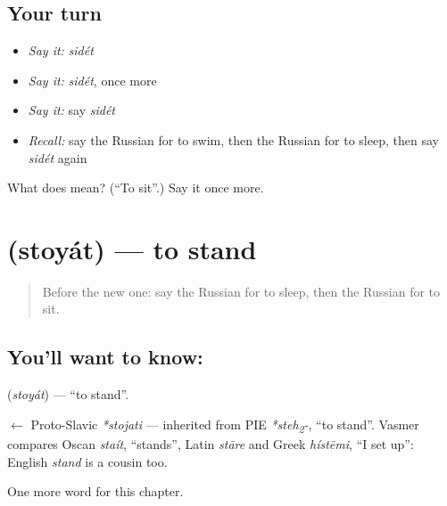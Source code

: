 \subsection*{Your turn}
\begin{itemize}
\raggedright
  \item \emph{Say it:} \emph{sidét}
  \item \emph{Say it:} \emph{sidét}, once more
  \item \emph{Say it:} say \emph{sidét}
  \item \emph{Recall:} say the Russian for to swim, then the Russian for to sleep, then say \emph{sidét} again
\end{itemize}

\begin{tcolorbox}[breakable,colback=teal!4,colframe=teal!35!black,title={Before you move on}]
What does  mean? (\textquotedblleft{}To sit\textquotedblright{}.) Say it once more.
\end{tcolorbox}
\section[\texorpdfstring{\ru{стоять} (stoyát)}{стоять (stoyát)}]{ (stoyát) — to stand}

\label{lesson:RU-C40-stoyat}



\begin{quote}
Before the new one: say the Russian for to sleep, then the Russian for to sit.
\end{quote}

\subsection*{You'll want to know: }
\textbf{} (\emph{stoyát}) — \textquotedblleft{}to stand\textquotedblright{}.

\begin{cousinweb}
\textbf{} $\leftarrow$ Proto-Slavic \emph{*stojati} — inherited from PIE \emph{*steh\textsubscript{2}-}, \textquotedblleft{}to stand\textquotedblright{}. Vasmer compares Oscan \emph{staít}, \textquotedblleft{}stands\textquotedblright{}, Latin \emph{stāre} and Greek \emph{hístēmi}, \textquotedblleft{}I set up\textquotedblright{}: English \emph{stand} is a cousin too.
\end{cousinweb}

\begin{grammarlens}[title={What you've built}]
One more word for this chapter.
\end{grammarlens}

